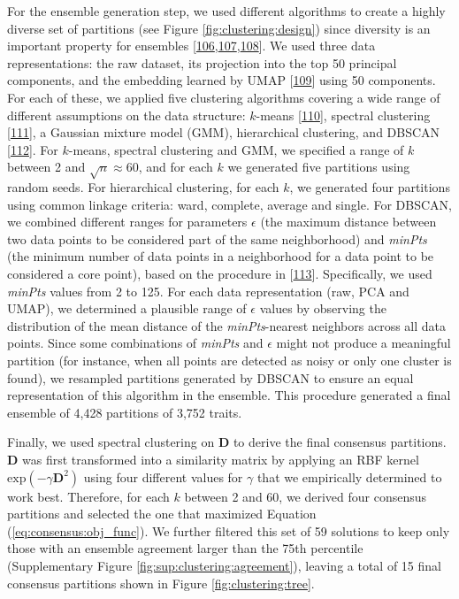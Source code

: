 \documentclass[
]{article}
\begin{document}
For the ensemble generation step, we used different algorithms to create a highly diverse set of partitions (see Figure \ref{fig:clustering:design}) since diversity is an important property for ensembles {[}\protect\hyperlink{ref-8js8Q3pF}{106},\protect\hyperlink{ref-rcTMvL18}{107},\protect\hyperlink{ref-t5p3UpxZ}{108}{]}.
We used three data representations: the raw dataset, its projection into the top 50 principal components, and the embedding learned by UMAP {[}\protect\hyperlink{ref-157h5hA34}{109}{]} using 50 components.
For each of these, we applied five clustering algorithms covering a wide range of different assumptions on the data structure: \(k\)-means {[}\protect\hyperlink{ref-MxGpAiPu}{110}{]}, spectral clustering {[}\protect\hyperlink{ref-x3CT24TB}{111}{]}, a Gaussian mixture model (GMM), hierarchical clustering, and DBSCAN {[}\protect\hyperlink{ref-JrL3iQea}{112}{]}.
For \(k\)-means, spectral clustering and GMM, we specified a range of \(k\) between 2 and \(\sqrt{n} \approx 60\), and for each \(k\) we generated five partitions using random seeds.
For hierarchical clustering, for each \(k\), we generated four partitions using common linkage criteria: ward, complete, average and single.
For DBSCAN, we combined different ranges for parameters \(\epsilon\) (the maximum distance between two data points to be considered part of the same neighborhood) and \emph{minPts} (the minimum number of data points in a neighborhood for a data point to be considered a core point), based on the procedure in {[}\protect\hyperlink{ref-FB7XPWl6}{113}{]}.
Specifically, we used \emph{minPts} values from 2 to 125.
For each data representation (raw, PCA and UMAP), we determined a plausible range of \(\epsilon\) values by observing the distribution of the mean distance of the \emph{minPts}-nearest neighbors across all data points.
Since some combinations of \emph{minPts} and \(\epsilon\) might not produce a meaningful partition (for instance, when all points are detected as noisy or only one cluster is found), we resampled partitions generated by DBSCAN to ensure an equal representation of this algorithm in the ensemble.
This procedure generated a final ensemble of 4,428 partitions of 3,752 traits.

Finally, we used spectral clustering on \(\mathbf{D}\) to derive the final consensus partitions.
\(\mathbf{D}\) was first transformed into a similarity matrix by applying an RBF kernel \(\mathrm{exp}(-\gamma \mathbf{D}^2)\) using four different values for \(\gamma\) that we empirically determined to work best.
Therefore, for each \(k\) between 2 and 60, we derived four consensus partitions and selected the one that maximized Equation (\ref{eq:consensus:obj_func}).
We further filtered this set of 59 solutions to keep only those with an ensemble agreement larger than the 75th percentile (Supplementary Figure \ref{fig:sup:clustering:agreement}), leaving a total of 15 final consensus partitions shown in Figure \ref{fig:clustering:tree}.
\end{document}
